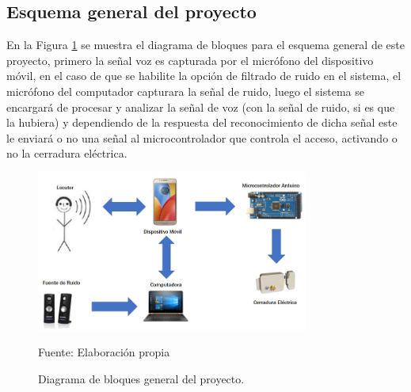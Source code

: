 \subsection{Esquema general del proyecto}
En la Figura \ref{fig:figura2.58} se muestra el diagrama de bloques para el esquema general de este proyecto, primero la señal voz es capturada por el micrófono del dispositivo móvil, en el caso de que se habilite la opción de filtrado de ruido en el sistema, el micrófono del computador capturara la señal de ruido, luego el sistema se encargará de procesar y analizar la señal de voz (con la señal de ruido, si es que la hubiera) y dependiendo de la respuesta del reconocimiento de dicha señal este le enviará o no una señal al microcontrolador que controla el acceso, activando o no la cerradura eléctrica.
\vskip 0.5cm
\begin{figure}[H]
\begin{center}
\includegraphics[width=0.8\textwidth]{Imagenes/Cap2/image059}
\end{center}
\begin{center}
\vskip -0.5cm
\caption{\small{Diagrama de bloques general del proyecto.}}
\label{fig:figura2.58}
{\small{Fuente: Elaboración propia}}
\end{center}
\end{figure}